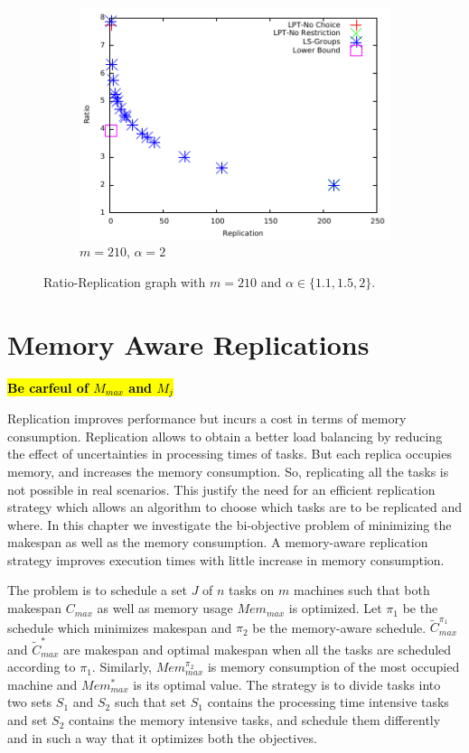\documentclass[twocolumn]{svjour3}
\newcommand{\todo}[1]{{\color{red}\textbf{\hl{#1}}\xspace}}
\begin{document}
\begin {figure}
  \begin{subfigure}[b]{0.5\textwidth}
    \includegraphics[width=\textwidth]{alpha_2.pdf}
    \caption{$m=210$, $\alpha=2$}
    \label{fig:3}
  \end{subfigure} %

  \caption{Ratio-Replication graph with $m=210$ and $\alpha \in \{1.1, 1.5, 2\}$.}
  \label{fig:Graph}
\end{figure}


\section{Memory Aware Replications}\label{ch5}
   
\todo{Be carfeul of $M_{max}$ and $M_j$}
   
Replication improves performance but incurs a cost in terms of memory
consumption.  Replication allows to obtain a better load balancing by
reducing the effect of uncertainties in processing times of tasks. But
each replica occupies memory, and increases the memory consumption.
So, replicating all the tasks is not possible in real scenarios. This
justify the need for an efficient replication strategy which allows an
algorithm to choose which tasks are to be replicated and where.  In
this chapter we investigate the bi-objective problem of minimizing the
makespan as well as the memory consumption. A memory-aware replication
strategy improves execution times with little increase in memory
consumption.

The problem is to schedule a set $J$ of $n$ tasks on $m$ machines such
that both makespan $C_{max}$ as well as memory usage $Mem_{max}$ is
optimized.  Let $\pi_1$ be the schedule which minimizes makespan and
$\pi_2$ be the memory-aware schedule. $\tilde{C}^{\pi_1}_{max}$ and
$\tilde{C}^{*}_{max}$ are makespan and optimal makespan when all the
tasks are scheduled according to $\pi_1$. Similarly, $Mem^{\pi_2}_{max}$
is memory consumption of the most occupied machine and $Mem^*_{max}$ is
its optimal value. The strategy is to divide tasks into two sets $S_1$
and $S_2$ such that set $S_1$ contains the processing time intensive
tasks and set $S_2$ contains the memory intensive tasks, and schedule
them differently and in such a way that it optimizes both the
objectives.
     
\end{document}
